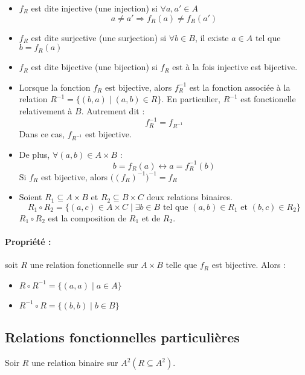 \documentclass[12pt, a4paper]{report}
\begin{document}
\begin{itemize}
\item $f_R$ est dite injective (une injection) si $\forall a, a' \in
  A$
\[a\neq a' \Rightarrow f_R(a) \neq f_R(a')\]

\item $f_R$ est dite surjective (une surjection) si $\forall b\in B$,
  il existe $a\in A$ tel que $b = f_R(a)$

\item $f_R$ est dite bijective (une bijection) si $f_R$ est à la fois
  injective est bijective.

\item Lorsque la fonction $f_R$ est bijective, alors $f_R^{-1}$ est la
  fonction associée à la relation $R^{-1} = \{(b,a) \mid (a,b) \in
  R\}$. En particulier, $R^{-1}$ est fonctionelle relativement à
  $B$. Autrement dit :
\[f_R^{-1} = f_{R^{-1}}\]
Dans ce cas, $f_{R^{-1}}$ est bijective.

\item De plus, $\forall (a, b) \in A\times B$ : 
\[b=f_R(a) \leftrightarrow a = f_R^{-1}(b)\]
Si $f_R$ est bijective, alors $\big((f_R)^{-1}\big)^{-1} = f_R$

\item Soient $R_1 \subseteq A\times B$ et $R_2 \subseteq B\times C$
  deux relations binaires.
\[R_1 \circ R_2 = \{(a,c) \in A \times C \mid \exists b\in B
\text{ tel que }(a,b)\in R_1 \text{ et } (b,c)\in R_2\} \]
$R_1 \circ R_2$ est la composition de $R_1$ et de $R_2$.
\end{itemize}

\paragraph{Propriété :} soit $R$ une relation fonctionnelle sur $A\times B$
telle que $f_R$ est bijective. Alors :

\begin{itemize}
\item $R\circ R^{-1} = \{(a,a)\mid a\in A\}$
\item $R^{-1}\circ R = \{(b,b)\mid b\in B\}$
\end{itemize}

\subsection{Relations fonctionnelles particulières}
Soir $R$ une relation binaire sur $A^2 (R\subseteq A^2)$.
\end{document}

